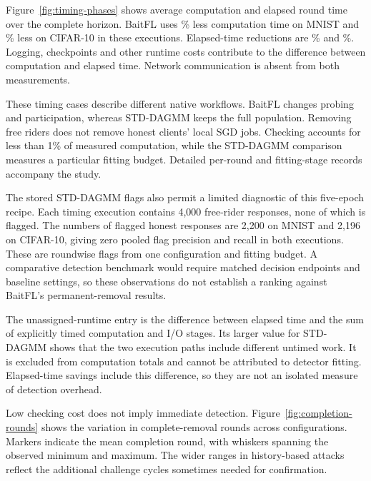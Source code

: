 \documentclass[conference]{IEEEtran}
\begin{document}
Figure~\ref{fig:timing-phases} shows average
computation and elapsed round time over the complete horizon. BaitFL uses
\TimingMnistReduction\% less computation time on MNIST and
\TimingCifarReduction\% less on CIFAR-10 in these executions. Elapsed-time
reductions are \TimingMnistWallReduction\% and
\TimingCifarWallReduction\%. Logging, checkpoints and other runtime costs
contribute to the difference between computation and elapsed time. Network
communication is absent from both measurements.



These timing cases describe different native workflows. BaitFL changes
probing and participation, whereas STD-DAGMM keeps the full population.
Removing free riders does not remove honest clients' local SGD jobs.
Checking accounts for less than 1\% of measured computation,
while the STD-DAGMM comparison measures a particular fitting budget.
Detailed per-round and fitting-stage records accompany the study.

The stored STD-DAGMM flags also permit a limited diagnostic of this
five-epoch recipe. Each timing execution contains 4,000 free-rider
responses, none of which is flagged. The numbers of flagged honest
responses are 2,200 on MNIST and 2,196 on CIFAR-10, giving zero pooled
flag precision and recall in both executions. These are roundwise flags
from one configuration and fitting budget. A comparative detection
benchmark would require matched decision endpoints and baseline settings,
so these observations do not establish a ranking against BaitFL's
permanent-removal results.

The unassigned-runtime entry is the difference between elapsed time and
the sum of explicitly timed computation and I/O stages. Its larger value
for STD-DAGMM shows that the two execution paths include different
untimed work. It is excluded from computation totals and cannot be
attributed to detector fitting. Elapsed-time savings include this
difference, so they are not an isolated measure of detection overhead.

Low checking cost does not imply immediate detection.
Figure~\ref{fig:completion-rounds} shows the variation in complete-removal
rounds across configurations. Markers indicate the mean completion round,
with whiskers spanning the observed minimum and maximum.
The wider ranges in history-based attacks
reflect the additional challenge cycles sometimes needed for confirmation.

\end{document}

